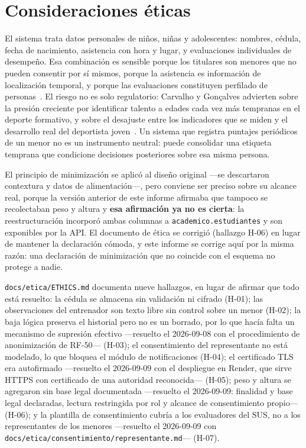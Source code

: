 \documentclass[11pt,a4paper]{article}
\newcommand{\ruta}[1]{\texttt{\footnotesize #1}}
\begin{document}
\section{Consideraciones éticas}
\label{sec:etica}

El sistema trata datos personales de niños, niñas y adolescentes: nombres,
cédula, fecha de nacimiento, asistencia con hora y lugar, y evaluaciones
individuales de desempeño. Esa combinación es sensible porque los titulares
son menores que no pueden consentir por sí mismos, porque la asistencia es
información de localización temporal, y porque las evaluaciones constituyen
perfilado de personas~\cite{lopdp2021,acm2018}. El riesgo no es solo
regulatorio: Carvalho y Gonçalves advierten sobre la presión creciente por
identificar talento a edades cada vez más tempranas en el deporte
formativo, y sobre el desajuste entre los indicadores que se miden y el
desarrollo real del deportista
joven~\cite{carvalho2023talento}. Un sistema que registra
puntajes periódicos de un menor no es un instrumento neutral: puede
consolidar una etiqueta temprana que condicione decisiones posteriores
sobre esa misma persona.

El principio de minimización se aplicó al diseño original —se descartaron
contextura y datos de alimentación—, pero conviene ser preciso sobre su
alcance real, porque la versión anterior de este informe afirmaba que
tampoco se recolectaban peso y altura y \textbf{esa afirmación ya no es
cierta}: la reestructuración incorporó ambas columnas a
\texttt{academico.estudiantes} y son exponibles por la API. El documento de
ética se corrigió (hallazgo H-06) en lugar de mantener la declaración
cómoda, y este informe se corrige aquí por la misma razón: una declaración
de minimización que no coincide con el esquema no protege a nadie.

\ruta{docs/etica/ETHICS.md} documenta nueve hallazgos, en lugar de afirmar
que todo está resuelto: la cédula se almacena sin validación ni cifrado
(H-01); las observaciones del entrenador son texto libre sin control sobre
un menor (H-02); la baja lógica preserva el historial pero no es un borrado,
por lo que hacía falta un mecanismo de supresión efectivo —resuelto el
2026-09-08 con el procedimiento de anonimización de RF-50— (H-03); el consentimiento del
representante no está modelado, lo que bloquea el módulo de notificaciones
(H-04); el certificado TLS era autofirmado —resuelto el 2026-09-09 con el
despliegue en Render, que sirve HTTPS con certificado de una autoridad
reconocida— (H-05); peso y altura se agregaron sin base legal
documentada —resuelto el 2026-09-09: finalidad y base legal declaradas,
lectura restringida por rol y alcance de consentimiento propio— (H-06); y la
plantilla de consentimiento cubría a los evaluadores del SUS, no a los
representantes de los menores —resuelto el 2026-09-09 con
\ruta{docs/etica/consentimiento/representante.md}— (H-07).
\end{document}
